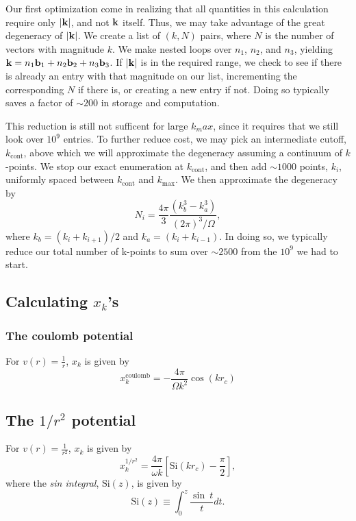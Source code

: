 \documentclass{article}
\begin{document}
Our first optimization come in realizing that all quantities in this
calculation require only $|\mathbf{k}|$, and not $\mathbf{k}$ itself.  Thus, we may
take advantage of the great degeneracy of $|\mathbf{k}|$.  We create a list
of $(k,N)$ pairs, where $N$ is the number of vectors with magnitude $k$.
We make nested loops over
$n_1$, $n_2$, and $n_3$, yielding $\mathbf{k} = n_1 \mathbf{b}_1 + n_2 \mathbf{b}_2 + n_3
\mathbf{b}_3$. If $|\mathbf{k}|$ is in the required range, we check to see if there
is already an entry with that magnitude on our list, incrementing the
corresponding $N$ if there is, or creating a new entry if not.  Doing
so typically saves a factor of $\sim 200$ in storage and computation.

This reduction is still not sufficent for large $k_max$, since it
requires that we still look over $10^9$ entries.  To further reduce
cost, we may pick an intermediate cutoff, $k_\text{cont}$, above which
we will approximate the degeneracy assuming a continuum of
$k$-points.  We stop our exact enumeration at $k_\text{cont}$, and
then add $\sim 1000$ points, $k_i$, uniformly spaced between $k_\text{cont}$
and $k_\text{max}$. We then approximate the degeneracy by
\begin{equation}
N_i = \frac{4 \pi}{3} \frac{\left( k_b^3 -k_a^3\right)}{(2\pi)^3/\Omega},
\end{equation}
where $k_b = (k_i + k_{i+1})/2$ and $k_a = (k_i + k_{i-1})$.  In doing
so, we typically reduce our total number of k-points to sum over $\sim
2500$ from the $10^9$ we had to start.

\subsection{Calculating $x_k$'s}
\subsubsection{The coulomb potential}
For $v(r) = \frac{1}{r}$, $x_k$ is given by
\begin{equation}
x_k^{\text{coulomb}} = -\frac{4 \pi}{\Omega k^2} \cos(k r_c)
\end{equation}

\subsection{The $1/r^2$ potential}
For $v(r) = \frac{1}{r^2}$, $x_k$ is given by
\begin{equation}
x_k^{1/r^2} = \frac{4 \pi}{\omega k} 
\left[ \text{Si}(k r_c) -\frac{\pi}{2}\right],
\end{equation}
where the {\em sin integral}, $\text{Si}(z)$, is given by
\begin{equation}
\text{Si}(z) \equiv \int_0^z \frac{\sin \ t}{t} dt.
\end{equation}
\end{document}

